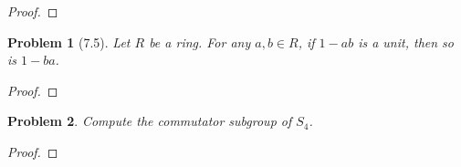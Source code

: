 \documentclass[10pt]{article}
\newcommand{\sk}{\vskip 10mm}
\theoremstyle{plain}
\newtheorem{problem}{Problem}
\theoremstyle{remark}
\begin{document}
\begin{proof}
  
\end{proof}

\sk

\begin{problem}[7.5]
  Let $R$ be a ring. For any $a,b\in R$, if $1-ab$ is a unit, then so is $1-ba$.
\end{problem}

\begin{proof}
  
\end{proof}

\sk

\begin{problem} 
  Compute the commutator subgroup of $S_4$.
\end{problem}

\begin{proof}
  
\end{proof}

\sk

\end{document}
